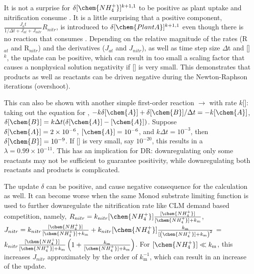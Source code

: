 \documentclass[gmd, manuscript]{copernicus}
\begin{document}
It is not a surprise for $\delta [\chem{NH_4^+}]^{k+1,1}$ to be positive as
plant  uptake and nitrification consume . It is a
little surprising
that a positive component, $\frac{J_at}{1/\Delta t + J_{at} + J_{nitr}}
R_{nitr}$, is introduced to $\delta [\chem{PlantA}]^{k+1,1}$ even though there
is no reaction that consumes .  Depending on the relative magnitude of
the rates (R$_{at}$ and R$_{nitr}$) and the derivatives ($J_{at}$ and
$J_{nitr}$), as well as time step size $\Delta$t and []$^k$, the
update can be positive, which can result in too small a scaling factor that
causes a nonphysical solution negativity if [] is very small. This demonstrates
that products as well as reactants can be driven negative
during the Newton-Raphson iterations (overshoot).

This can also be shown with another simple first-order reaction 
$\rightarrow$  with rate $k$[]: taking out the equation for
, $-k\delta[\chem{A}] + \delta[\chem{B}]/\Delta t = -k [\chem{A}]$,
$\delta[\chem{B}] = k\Delta t (\delta[\chem{A}] - [\chem{A}])$. Suppose 
$\delta[\chem{A}] = 2\times10^{-6}$,
$[\chem{A}]=10^{-6}$, and $k\Delta t = 10^{-3}$, then
$\delta[\chem{B}]=10^{-9}$. If [] is very small, say $10^{-20}$, this
results in a $\lambda=0.99\times 10^{-11}$. This has an implication for DR:
downregulating only some reactants may not be sufficient to guarantee
positivity, while downregulating both reactants and products is complicated.  

The update $\delta$ can be positive, and cause negative
consequence for the calculation as well. 
It can become worse when the same Monod substrate limiting function is used to
further downregulate the nitrification rate like CLM demand based competition,
namely,
$R_{nitr} = k_{nitr}[\chem{NH_4^+}]\frac{[\chem{NH_4^+}]}{[\chem{NH_4^+}]+k_\text{m}}$,
$J_{nitr} = k_{nitr}\frac{[\chem{NH_4^+}]}{[\chem{NH_4^+}]+k_\text{m}}
+k_{nitr}[\chem{NH_4^+}]\frac{k_\text{m}}{[\left(\chem{NH_4^+}]+k_\text{m}\right)^2}$
=$k_{nitr}\frac{[\chem{NH_4^+}]}{[\chem{NH_4^+}]+k_\text{m}}\left(1 +
\frac{k_\text{m}}{[\chem{NH_4^+}]+k_\text{m}}\right)$.  For $[\chem{NH_4^+}]
\ll k_\text{m}$, this increases $J_{nitr}$ approximately by the order of
$k_\text{m}^{-1}$, which can result in an increase of the update.
\end{document}
